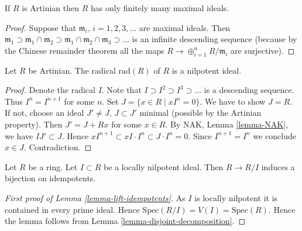 \begin{lemma}
\label{lemma-artinian-finite-nr-max}
If $R$ is Artinian then $R$ has only finitely many maximal ideals.
\end{lemma}

\begin{proof}
Suppose that $\mathfrak m_i$, $i = 1, 2, 3, \ldots$ are maximal ideals.
Then $\mathfrak m_1 \supset \mathfrak m_1\cap \mathfrak m_2
\supset \mathfrak m_1 \cap \mathfrak m_2 \cap \mathfrak m_3 \supset \ldots$
is an infinite descending sequence (because by the Chinese
remainder theorem all the maps $R \to \oplus_{i = 1}^n R/\mathfrak m_i$
are surjective).
\end{proof}

\begin{lemma}
\label{lemma-artinian-radical-nilpotent}
Let $R$ be Artinian. The radical $\text{rad}(R)$ of $R$ is
a nilpotent ideal.
\end{lemma}

\begin{proof}
Denote the radical $I$.
Note that $I \supset I^2 \supset I^3 \supset \ldots$ is a descending
sequence. Thus $I^n = I^{n + 1}$ for some $n$.
Set $J = \{ x\in R \mid xI^n = 0\}$. We have to show $J = R$.
If not, choose an ideal $J' \not= J$, $J \subset J'$ minimal (possible
by the Artinian property). Then $J' = J + Rx$ for some $x \in R$.
By NAK, Lemma \ref{lemma-NAK}, we have $IJ' \subset J$.
Hence $xI^{n + 1} \subset xI \cdot I^n \subset J \cdot I^n = 0$.
Since $I^{n + 1} = I^n$ we conclude $x\in J$. Contradiction.
\end{proof}

\begin{lemma}
\label{lemma-lift-idempotents}
Let $R$ be a ring. Let $I \subset R$ be a locally nilpotent ideal.
Then $R \to R/I$ induces a bijection on idempotents.
\end{lemma}

\begin{proof}[First proof of Lemma \ref{lemma-lift-idempotents}]
As $I$ is locally nilpotent it is contained in every prime ideal.
Hence $\text{Spec}(R/I) = V(I) = \text{Spec}(R)$. Hence the
lemma follows from Lemma \ref{lemma-disjoint-decomposition}.
\end{proof}

